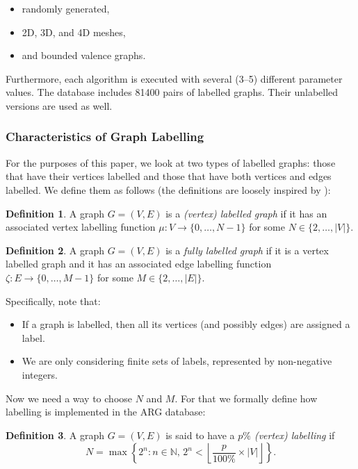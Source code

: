 \documentclass{article}
\theoremstyle{definition}
\newtheorem{definition}{Definition}[section]
\begin{document}
\begin{itemize}
\item randomly generated,
\item 2D, 3D, and 4D meshes,
\item and bounded valence graphs.
\end{itemize}

Furthermore, each algorithm is executed with several (3--5) different parameter
values. The database includes 81400 pairs of labelled graphs. Their unlabelled
versions are used as well.

\subsubsection{Characteristics of Graph Labelling}
For the purposes of this paper, we look at two types of labelled graphs: those
that have their vertices labelled and those that have both vertices and edges
labelled. We define them as follows (the definitions are loosely inspired by
\cite{abu-aisheh_2016}):

\begin{definition}
  A graph $G = (V, E)$ is a \emph{(vertex) labelled graph} if it has an associated
  vertex labelling function $\mu \colon V \to \{ 0, \dots, N - 1 \}$ for some $N
  \in \{2, \dots, |V| \}$.
\end{definition}

\begin{definition}
  A graph $G = (V, E)$ is a \emph{fully labelled graph} if it is a vertex labelled
  graph and it has an associated edge labelling function $\zeta \colon E \to
  \{ 0, \dots, M - 1 \}$ for some $M \in \{ 2, \dots, |E| \}$.
\end{definition}

Specifically, note that:

\begin{itemize}
\item If a graph is labelled, then all its vertices (and possibly edges) are
  assigned a label.
\item We are only considering finite sets of labels, represented by non-negative integers.
\end{itemize}

Now we need a way to choose $N$ and $M$. For that we formally define how
labelling is implemented in the ARG database:

\begin{definition}
  A graph $G = (V, E)$ is said to have a \emph{$p\%$ (vertex) labelling} if
  \[ N = \max \left\{ 2^n : n \in \mathbb{N},\, 2^n < \left\lfloor \frac{p}{100\%}
        \times |V| \right\rfloor \right\}. \]
\end{definition}
\end{document}
